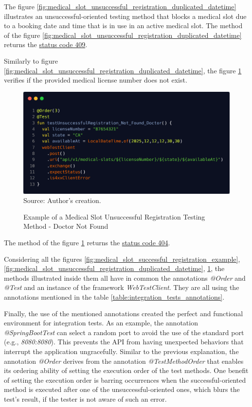 The figure \ref{fig:medical_slot_unsuccessful_registration_duplicated_datetime} illustrates an unsuccessful-oriented testing method that blocks a medical slot due to a booking date and time that is in use in an active medical slot. The method of the figure \ref{fig:medical_slot_unsuccessful_registration_duplicated_datetime} returns the \hyperref[tab:summary_http_status_codes]{status code 409}.

Similarly to figure \ref{fig:medical_slot_unsuccessful_registration_duplicated_datetime}, the figure \ref{fig:medical_slot_unsuccessful_registration_not_found_doctor} verifies if the provided medical license number does not exist. 

\begin{figure}[H]
    \centering
    \caption{Example of a Medical Slot Unsuccessful Registration Testing Method - Doctor Not Found}
    \includegraphics[width=1\linewidth]{figures/medical_slot_unsuccessful_registration_not_found_doctor.png}
    \footnotesize Source: Author's creation.
    \label{fig:medical_slot_unsuccessful_registration_not_found_doctor}
\end{figure}

The method of the figure \ref{fig:medical_slot_unsuccessful_registration_not_found_doctor} returns the \hyperref[tab:summary_http_status_codes]{status code 404}.

Considering all the figures \ref{fig:medical_slot_successful_registration_example},
\ref{fig:medical_slot_unsuccessful_registration_duplicated_datetime},
\ref{fig:medical_slot_unsuccessful_registration_not_found_doctor}, the methods illustrated inside them all have in common the annotations \textit{@Order} and \textit{@Test} and an instance of the framework \textit{WebTestClient}. They are all using the annotations mentioned in the table \ref{table:integration_tests_annotations}. 

Finally, the use of the mentioned annotations created the perfect and functional environment for integration tests. As an example, the annotation \textit{@SpringBootTest} can select a random port to avoid the use of the standard port (e.g., \textit{8080:8080}). This prevents the API from having unexpected behaviors that interrupt the application ungracefully. Similar to the previous explanation, the annotation \textit{@Order} derives from the annotation \textit{@TestMethodOrder} that enables its ordering ability of setting the execution order of the test methods. One benefit of setting the execution order is barring occurrences when the successful-oriented method is executed after one of the unsuccessful-oriented ones, which blurs the test's result, if the tester is not aware of such an error.
